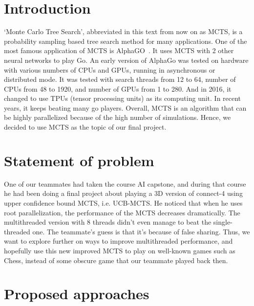 \documentclass[sigconf]{acmart}
\begin{document}
\maketitle

\section{Introduction}
`Monte Carlo Tree Search', abbreviated in this text from now on as MCTS, is a probability sampling based tree search method for many applications. One of the most famous application of MCTS is AlphaGO~\cite{alphaGo}. It uses MCTS with 2 other neural networks to play Go. An early version of AlphaGo was tested on hardware with various numbers of CPUs and GPUs, running in asynchronous or distributed mode. It was tested with search threads from 12 to 64, number of CPUs from 48 to 1920, and number of GPUs from 1 to 280. And in 2016, it changed to use TPUs (tensor processing units) as its computing unit. In recent years, it keeps beating many go players. Overall, MCTS is an algorithm that can be highly parallelized because of the high number of simulations. Hence, we decided to use MCTS as the topic of our final project.

\section{Statement of problem}
One of our teammates had taken the course AI capstone, and during that course he had been doing a final project about playing a 3D version of connect-4 using upper confidence bound MCTS, i.e. UCB-MCTS. He noticed that when he uses root parallelization, the performance of the MCTS decreases dramatically. The multithreaded version with 8 threads didn't even manage to beat the single-threaded one. The teammate's guess is that it's because of false sharing. Thus, we want to explore further on ways to improve multithreaded performance, and hopefully use this new improved MCTS to play on well-known games such as Chess, instead of some obscure game that our teammate played back then.\\


\section{Proposed approaches}
\end{document}
